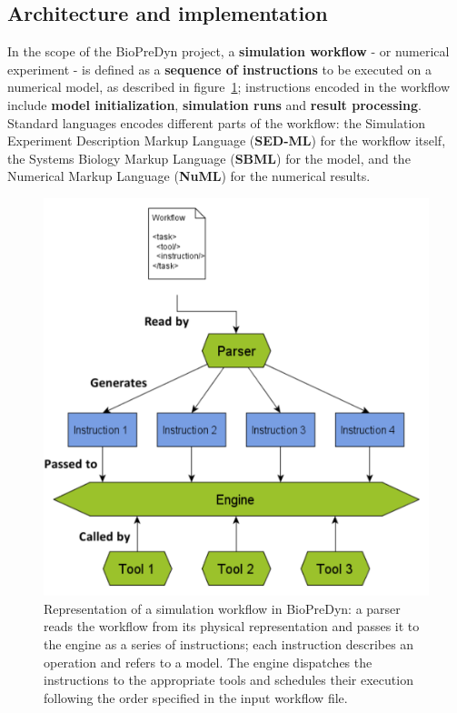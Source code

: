 \documentclass[17pt,portrait,a1,usenames,dvipsnames,plainboxedsections]{sciposter}
\begin{document}
\begin{multicols}{2}

\section{Architecture and implementation}
In the scope of the BioPreDyn project, a {\bf simulation workflow} - or
numerical experiment - is defined as a {\bf sequence of instructions} to be
executed on a numerical model, as described in figure~\ref{fig:workflow};
instructions encoded in the workflow include {\bf model initialization},
{\bf simulation runs} and {\bf result processing}. Standard languages encodes
different parts of the workflow: the Simulation Experiment Description Markup
Language\cite{Kohn2008} ({\bf SED-ML}) for the workflow itself, the Systems
Biology Markup Language\cite{Hucka2003} ({\bf SBML}) for the model, and the
Numerical Markup Language ({\bf NuML}) for the numerical results.

\begin{figure}
\begin{minipage}[c]{0.5\textwidth}
\includegraphics[width=\textwidth]{proposal_complete.pdf}
\end{minipage}\hfill
\begin{minipage}[c]{0.45\textwidth}
\caption{Representation of a simulation workflow in BioPreDyn: a parser reads
the workflow from its physical representation and passes it to the engine as a
series of instructions; each instruction describes an operation and refers to
a model. The engine dispatches the instructions to the appropriate tools and
schedules their execution following the order specified in the input workflow
file.}
\label{fig:workflow}
\end{minipage}
\end{figure}


\end{multicols}
\end{document}
